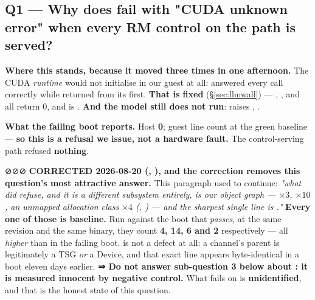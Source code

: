 \documentclass[10.5pt]{article}
\begin{document}
\subsection*{Q1 --- Why does  fail with "CUDA unknown error" when every RM control on the path is served?}

\textbf{Where this stands, because it moved three times in one afternoon.} The CUDA \emph{runtime}
would not initialise in our guest at all:  answered every call correctly while
 returned  from its first. \textbf{That is fixed}
(\S\ref{sec:llmwall}) — , ,  and
 all return 0, and  is .
\textbf{And the model still does not run}:  raises
, .

\textbf{What the failing boot reports.} Host  \textbf{0}; guest  line count
at the green baseline — \textbf{so this is a refusal we issue, not a hardware fault.} The
control-serving path refused \textbf{nothing}.

\begin{warnbox}\small
⊘⊘⊘ \textbf{CORRECTED 2026-08-20 (, ), and the correction removes
this question's most attractive answer.} This paragraph used to continue: \emph{"what did refuse,
and it is a different subsystem entirely, is our object graph
---  $\times 3$, 
$\times 10$, an unmapped allocation class $\times 4$ (, ) --- and the
sharpest single line is ."}
\textbf{Every one of those is baseline.} Run against the boot that \emph{passes}, at the same
revision and the same binary, they count \textbf{4, 14, 6 and 2} respectively --- all
\emph{higher} than in the failing boot.  is not a defect at all: a
channel's parent is legitimately a TSG \emph{or} a Device, and that exact line appears
byte-identical in a boot eleven days earlier. \textbf{⇒ Do not answer sub-question 3 below about
: it is measured innocent by negative control.} What  fails on
is \textbf{unidentified}, and that is the honest state of this question.
\end{warnbox}
\end{document}
